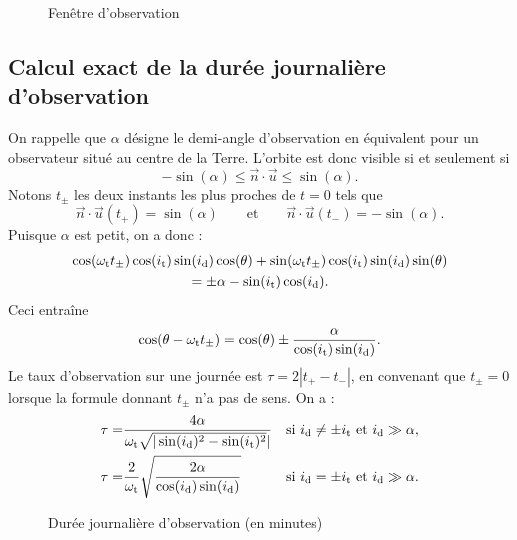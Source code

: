 \begin{figure}
\begin{center}
\scriptsize
\def\figurewidth{0.6\linewidth}

\caption{Fenêtre d'observation} \label{fenetre}
\end{center}
\end{figure}



\subsection{Calcul exact de la durée journalière d'observation}

On rappelle que $\alpha$ désigne le demi-angle d'observation en équivalent pour un observateur situé au centre de la Terre. L'orbite est donc visible si et seulement si
\[ -\sin(\alpha) \leq \vec{n} \cdot \vec{u} \leqslant \sin(\alpha).\]
Notons $t_\pm$ les deux instants les plus proches de $t=0$ tels que
\[  \vec{n} \cdot \vec{u}(t_+) = \sin(\alpha) \qquad \text{et} \qquad  \vec{n} \cdot \vec{u}(t_-) = -\sin(\alpha).\] 
Puisque $\alpha$ est petit, on a donc :
\begin{multline*}
\cos(\omega_\text{t} t_\pm) \cos(i_\text{t}) \sin(i_\text{d}) \cos(\theta) + \sin(\omega_\text{t} t_\pm) \cos(i_\text{t})\sin(i_\text{d})\sin(\theta) \\
 = \pm\alpha -  \sin(i_\text{t})\cos(i_\text{d}).
\end{multline*}
Ceci entraîne
\[ \cos(\theta - \omega_\text{t} t_\pm) = \cos(\theta) \pm  \frac{\alpha}{\cos(i_\text{t})\sin(i_\text{d})}.\]
Le taux d'observation sur une journée est  $ \tau = 2| t_+ - t_-|$, en convenant que $t_\pm = 0$ lorsque la formule donnant $t_\pm$ n'a pas de sens. On a :
\begin{align*}
 \tau = & \frac{4\alpha}{\omega_\text{t}\sqrt{|\sin(i_\text{d})^2 - \sin(i_\text{t})^2}|} & \text{si $i_\text{d} \neq \pm i_\text{t}$ et $i_\text{d} \gg \alpha$}, \\
 \tau = &  \frac{2}{\omega_\text{t}}\sqrt{\frac{2 \alpha}{\cos(i_\text{d})\sin(i_\text{d})}} & \text{si $i_\text{d} = \pm i_\text{t}$ et $i_\text{d} \gg \alpha$}.
\end{align*}%

\begin{figure}
\scriptsize
\begin{center}
\def\svgwidth{0.5\linewidth}
 
 \vspace*{-2em}
\caption{Durée journalière d'observation (en minutes)} \label{observabilite}
\end{center}
\end{figure}%

